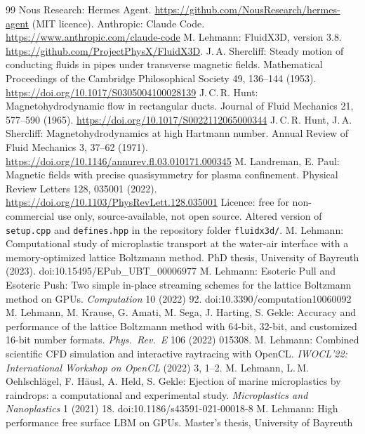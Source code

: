 \documentclass[10pt,a4paper]{article}
\begin{document}
\begin{thebibliography}{99}
 Nous Research: Hermes Agent. \url{https://github.com/NousResearch/hermes-agent} (MIT licence).
 Anthropic: Claude Code. \url{https://www.anthropic.com/claude-code}
 M. Lehmann: FluidX3D, version 3.8. \url{https://github.com/ProjectPhysX/FluidX3D}.
 J.\,A. Shercliff: Steady motion of conducting fluids in pipes under transverse magnetic fields. Mathematical Proceedings of the Cambridge Philosophical Society 49, 136--144 (1953). \url{https://doi.org/10.1017/S0305004100028139}
 J.\,C.\,R. Hunt: Magnetohydrodynamic flow in rectangular ducts. Journal of Fluid Mechanics 21, 577--590 (1965). \url{https://doi.org/10.1017/S0022112065000344}
 J.\,C.\,R. Hunt, J.\,A. Shercliff: Magnetohydrodynamics at high Hartmann number. Annual Review of Fluid Mechanics 3, 37--62 (1971). \url{https://doi.org/10.1146/annurev.fl.03.010171.000345}
 M. Landreman, E. Paul: Magnetic fields with precise quasisymmetry for plasma confinement. Physical Review Letters 128, 035001 (2022). \url{https://doi.org/10.1103/PhysRevLett.128.035001}
  Licence: free for non-commercial use only, source-available, not open source.
  Altered version of \texttt{setup.cpp} and \texttt{defines.hpp} in the repository folder \texttt{fluidx3d/}.
 M. Lehmann: Computational study of microplastic transport at the water-air interface with
  a memory-optimized lattice Boltzmann method. PhD thesis, University of Bayreuth (2023).
  doi:10.15495/EPub\_UBT\_00006977
 M. Lehmann: Esoteric Pull and Esoteric Push: Two simple in-place streaming schemes for
  the lattice Boltzmann method on GPUs. \emph{Computation} 10 (2022) 92. doi:10.3390/computation10060092
 M. Lehmann, M. Krause, G. Amati, M. Sega, J. Harting, S. Gekle: Accuracy and
  performance of the lattice Boltzmann method with 64-bit, 32-bit, and customized 16-bit number formats.
  \emph{Phys.\ Rev.\ E} 106 (2022) 015308.
 M. Lehmann: Combined scientific CFD simulation and interactive raytracing with
  OpenCL. \emph{IWOCL'22: International Workshop on OpenCL} (2022) 3, 1--2.
 M. Lehmann, L.\,M. Oehlschlägel, F. Häusl, A. Held, S. Gekle: Ejection of marine
  microplastics by raindrops: a computational and experimental study. \emph{Microplastics and Nanoplastics} 1
  (2021) 18. doi:10.1186/s43591-021-00018-8
 M. Lehmann: High performance free surface LBM on GPUs. Master's thesis, University of Bayreuth

\end{thebibliography}
\end{document}
